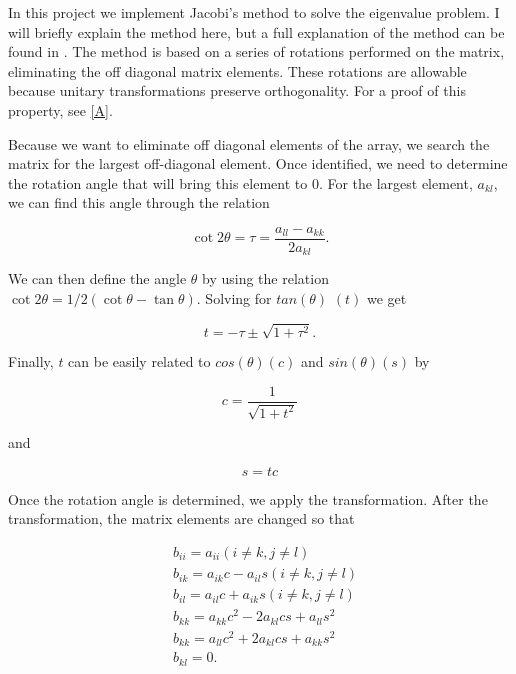 \documentclass[%
oneside,                 %
final,                   %
10pt]{article}
\begin{document}
In this project we implement Jacobi's method to solve the eigenvalue problem.  I will briefly explain the method here, but a full explanation of the method can be found in \cite{LectureNotes}.  The method is based on a series of rotations performed on the matrix, eliminating the off diagonal matrix elements.  These rotations are allowable because unitary transformations preserve orthogonality.  For a proof of this property, see \ref{A}.

Because we want to eliminate off diagonal elements of the array, we search the matrix for the largest off-diagonal element.  Once identified, we need to determine the rotation angle that will bring this element to 0.  For the largest element, $a_{kl}$, we can find this angle through the relation

\begin{equation*}
\cot 2\theta=\tau = \frac{a_{ll}-a_{kk}}{2a_{kl}}.
\end{equation*}

We can then define the angle $\theta$ by using the relation $\cot 2\theta=1/2(\cot \theta-\tan\theta)$.  Solving for $tan(\theta)$ $(t)$ we get

\begin{equation*}
  t = -\tau \pm \sqrt{1+\tau^2}.
\end{equation*}

Finally, $t$ can be easily related to $cos(\theta) (c)$ and $sin(\theta) (s)$ by

\begin{equation*}
   c = \frac{1}{\sqrt{1+t^2}}
\end{equation*}

and

\begin{equation*} 
s=tc
\end{equation*}

Once the rotation angle is determined, we apply the transformation.  After the transformation, the matrix elements are changed so that

\begin{equation*}
\begin{split}
& b_{ii}=a_{ii} (i \ne k, j \ne l) \\
& b_{ik}=a_{ik}c - a_{il}s  (i \ne k, j \ne l) \\
& b_{il}=a_{il}c + a_{ik}s  (i \ne k, j \ne l) \\
& b_{kk}=a_{kk}c^2 -2a_{kl}cs + a_{ll}s^2 \\
& b_{kk}=a_{ll}c^2 +2a_{kl}cs + a_{kk}s^2 \\
& b_{kl} = 0.
\end{split}
\end{equation*}
\end{document}
